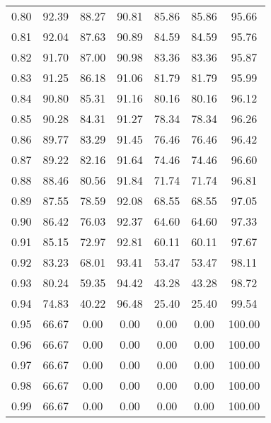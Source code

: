 \begin{tabular}{|c|c|c|c|c|c|c|}
      0.80 &     92.39 &     88.27 &      90.81 &   85.86 &      85.86 &         95.66 \\
      0.81 &     92.04 &     87.63 &      90.89 &   84.59 &      84.59 &         95.76 \\
      0.82 &     91.70 &     87.00 &      90.98 &   83.36 &      83.36 &         95.87 \\
      0.83 &     91.25 &     86.18 &      91.06 &   81.79 &      81.79 &         95.99 \\
      0.84 &     90.80 &     85.31 &      91.16 &   80.16 &      80.16 &         96.12 \\
      0.85 &     90.28 &     84.31 &      91.27 &   78.34 &      78.34 &         96.26 \\
      0.86 &     89.77 &     83.29 &      91.45 &   76.46 &      76.46 &         96.42 \\
      0.87 &     89.22 &     82.16 &      91.64 &   74.46 &      74.46 &         96.60 \\
      0.88 &     88.46 &     80.56 &      91.84 &   71.74 &      71.74 &         96.81 \\
      0.89 &     87.55 &     78.59 &      92.08 &   68.55 &      68.55 &         97.05 \\
      0.90 &     86.42 &     76.03 &      92.37 &   64.60 &      64.60 &         97.33 \\
      0.91 &     85.15 &     72.97 &      92.81 &   60.11 &      60.11 &         97.67 \\
      0.92 &     83.23 &     68.01 &      93.41 &   53.47 &      53.47 &         98.11 \\
      0.93 &     80.24 &     59.35 &      94.42 &   43.28 &      43.28 &         98.72 \\
      0.94 &     74.83 &     40.22 &      96.48 &   25.40 &      25.40 &         99.54 \\
      0.95 &     66.67 &      0.00 &       0.00 &    0.00 &       0.00 &        100.00 \\
      0.96 &     66.67 &      0.00 &       0.00 &    0.00 &       0.00 &        100.00 \\
      0.97 &     66.67 &      0.00 &       0.00 &    0.00 &       0.00 &        100.00 \\
      0.98 &     66.67 &      0.00 &       0.00 &    0.00 &       0.00 &        100.00 \\
      0.99 &     66.67 &      0.00 &       0.00 &    0.00 &       0.00 &        100.00 \\
\bottomrule
\end{tabular}
